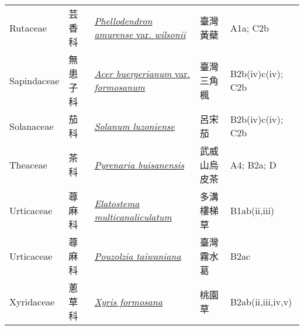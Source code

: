 {\begin{longtable}{L{2.5cm}L{2cm}L{5cm}L{2.5cm}L{3cm}}
    Rutaceae & 芸香科 & \href{http://www.theplantlist.org/tpl1.1/search?q=Phellodendron+amurense+var.+wilsonii}{\textit{Phellodendron amurense} var. \textit{wilsonii} } & 臺灣黃蘗 & A1a; C2b    \\
    Sapindaceae & 無患子科 & \href{http://www.theplantlist.org/tpl1.1/search?q=Acer+buergerianum+var.+formosanum}{\textit{Acer buergerianum} var. \textit{formosanum} } & 臺灣三角楓 & B2b(iv)c(iv); C2b    \\
    Solanaceae & 茄科 & \href{http://www.theplantlist.org/tpl1.1/search?q=Solanum+luzoniense}{\textit{Solanum luzoniense} } & 呂宋茄 & B2b(iv)c(iv); C2b    \\
    Theaceae & 茶科 & \href{http://www.theplantlist.org/tpl1.1/search?q=Pyrenaria+buisanensis}{\textit{Pyrenaria buisanensis} } & 武威山烏皮茶 & A4; B2a; D    \\
    Urticaceae & 蕁麻科 & \href{http://www.theplantlist.org/tpl1.1/search?q=Elatostema+multicanaliculatum}{\textit{Elatostema multicanaliculatum} } & 多溝樓梯草 & B1ab(ii,iii)    \\
    Urticaceae & 蕁麻科 & \href{http://www.theplantlist.org/tpl1.1/search?q=Pouzolzia+taiwaniana}{\textit{Pouzolzia taiwaniana} } & 臺灣霧水葛 & B2ac    \\
    Xyridaceae & 蔥草科 & \href{http://www.theplantlist.org/tpl1.1/search?q=Xyris+formosana}{\textit{Xyris formosana} } & 桃園草 & B2ab(ii,iii,iv,v)    \\
    \bottomrule
        \end{longtable}
        }
    